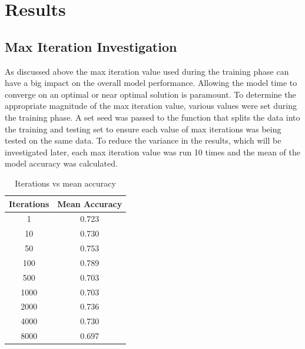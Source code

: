 \documentclass[10pt,twocolumn,letterpaper]{article}
\begin{document}
\section {Results}
\subsection{Max Iteration Investigation}
As discussed above the max iteration value used during the training phase can have a big impact on the
overall model performance. Allowing the model time to converge on an optimal or near optimal solution is
paramount. To determine the appropriate magnitude of the max iteration value, various values were set
during the training phase. A set seed was passed to the function that splits the data into the training
and testing set to ensure each value of max iterations was being tested on the same data.
To reduce the variance in the results,
which will be investigated later, each max iteration value was run 10 times and the mean of the model accuracy
was calculated.
\begin{table}[h!]
   \centering
   \begin{tabular}{ ||c c|| }
      \hline
      Iterations & Mean Accuracy \\
      \hline
      1          & 0.723         \\
      \hline
      10         & 0.730         \\
      \hline
      50         & 0.753         \\
      \hline
      100        & 0.789         \\
      \hline
      500        & 0.703         \\
      \hline
      1000       & 0.703         \\
      \hline
      2000       & 0.736         \\
      \hline
      4000       & 0.730         \\
      \hline
      8000       & 0.697         \\
      \hline
   \end{tabular}      \label{tab:iterations}
   \caption{Iterations vs mean accuracy}
\end{table}
\end{document}
